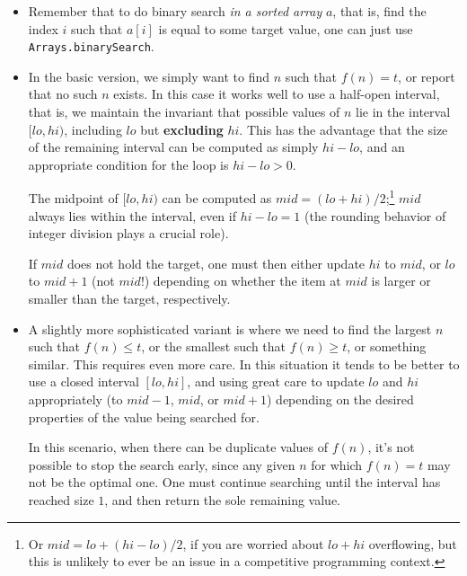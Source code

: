 \documentclass[10pt]{book}
\newif\iftodos
\newcommand{\todo}[1]{\iftodos\textcolor{red}{[TODO: #1]}\fi}
\begin{document}
\newcommand{\vlo}{\mathit{lo}}
\newcommand{\vhi}{\mathit{hi}}
\newcommand{\vmid}{\mathit{mid}}

\begin{itemize}
\item Remember that to do binary search \emph{in a sorted array} $a$,
  that is, find the index $i$ such that $a[i]$ is equal to some target
  value, one can just use \texttt{Arrays.binarySearch}.
\item In the basic version, we simply want to find $n$ such that
  $f(n) = t$, or report that no such $n$ exists.  In this case it
  works well to use a half-open interval, that is, we maintain the
  invariant that possible values of $n$ lie in the interval
  $[\vlo, \vhi)$, including $\vlo$ but \textbf{excluding}
  $\vhi$.  This has the advantage that the size of the
  remaining interval can be computed as simply $\vhi - \vlo$,
  and an appropriate condition for the loop is $\vhi - \vlo > 0$.

  The midpoint of $[\vlo, \vhi)$ can be computed as
  $\vmid = (\vlo + \vhi)/2$;\footnote{Or
    $\vmid = \vlo + (\vhi - \vlo)/2$, if you are worried about
    $\vlo + \vhi$ overflowing, but this is unlikely to ever be an
    issue in a competitive programming context.} $\vmid$ always
  lies within the interval, even if $\vhi - \vlo = 1$ (the rounding
  behavior of integer division plays a crucial role).

  If $\vmid$ does not hold the target, one must then either update
  $\vhi$ to $\vmid$, or $\vlo$ to $\vmid + 1$ (not $\vmid$!) depending
  on whether the item at $\vmid$ is larger or smaller than the target,
  respectively.

  \todo{Example code}

\item A slightly more sophisticated variant is where we need to find
  the largest $n$ such that $f(n) \leq t$, or the smallest such that
  $f(n) \geq t$, or something similar. This requires even more care.
  In this situation it tends to be better to use a closed interval
  $[\vlo, \vhi]$, and using great care to update $\vlo$ and $\vhi$
  appropriately (to $\vmid - 1$, $\vmid$, or $\vmid+1$) depending on
  the desired properties of the value being searched for.

  In this scenario, when there can be duplicate values of $f(n)$, it's
  not possible to stop the search early, since any given $n$ for which
  $f(n) = t$ may not be the optimal one.  One must continue searching
  until the interval has reached size $1$, and then return the sole
  remaining value.

  \todo{Talk about how to find midpoint based on whether we want greatest or least}
  \todo{Example code}
  \todo{if we want \emph{biggest} value satisfying something, need to
    set mid to CEILING of (lo+hi)/2?}
\end{itemize}
\end{document}
